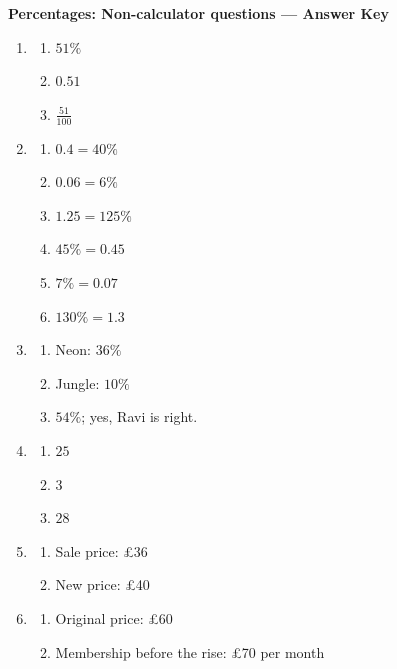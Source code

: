 \documentclass[11pt,a4paper]{article}
\begin{document}
\begin{center}
  {\Large\bfseries Percentages: Non-calculator questions --- Answer Key}
\end{center}

\begin{enumerate}

\item
\begin{enumerate}
  \item \(51\%\)
  \item \(0.51\)
  \item \(\frac{51}{100}\)
\end{enumerate}

\item
\begin{enumerate}
  \item \(0.4=40\%\)
  \item \(0.06=6\%\)
  \item \(1.25=125\%\)
  \item \(45\%=0.45\)
  \item \(7\%=0.07\)
  \item \(130\%=1.3\)
\end{enumerate}

\item
\begin{enumerate}
  \item Neon: \(36\%\)
  \item Jungle: \(10\%\)
  \item \(54\%\); yes, Ravi is right.
\end{enumerate}

\item
\begin{enumerate}
  \item \(25\)
  \item \(3\)
  \item \(28\)
\end{enumerate}

\item
\begin{enumerate}
  \item Sale price: \pounds36
  \item New price: \pounds40
\end{enumerate}

\item
\begin{enumerate}
  \item Original price: \pounds60
  \item Membership before the rise: \pounds70 per month
\end{enumerate}


\end{enumerate}
\end{document}

